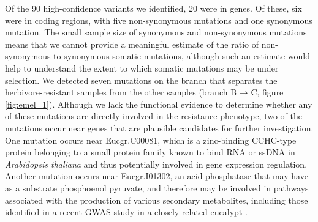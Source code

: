 Of the 90 high-confidence variants we identified, 20 were in genes. Of these, six were in coding regions, with five non-synonymous mutations and one synonymous mutation. The small sample size of synonymous and non-synonymous mutations means that we cannot provide a meaningful estimate of the ratio of non-synonymous to synonymous somatic mutations, although such an estimate would help to understand the extent to which somatic mutations may be under selection. We detected seven mutations on the branch that separates the herbivore-resistant samples from the other samples (branch B → C, figure \ref{fig:emel_1}). Although we lack the functional evidence to determine whether any of these mutations are directly involved in the resistance phenotype, two of the mutations occur near genes that are plausible candidates for further investigation. One mutation occurs near Eucgr.C00081, which is a zinc-binding CCHC-type protein belonging to a small protein family known to bind RNA or ssDNA in \textit{Arabidopsis thaliana} and thus potentially involved in gene expression regulation. Another mutation occurs near Eucgr.I01302, an acid phosphatase that may have as a substrate phosphoenol pyruvate, and therefore may be involved in pathways associated with the production of various secondary metabolites, including those identified in a recent GWAS study in a closely related eucalypt \parencite{kainer_high_2019}.

